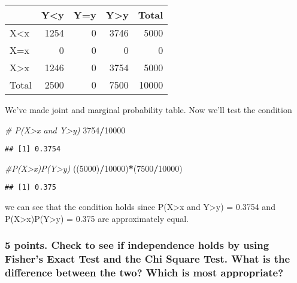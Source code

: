 \documentclass[]{article}
\newenvironment{Shaded}{\begin{snugshade}}{\end{snugshade}}
\newcommand{\CommentTok}[1]{\textcolor[rgb]{0.56,0.35,0.01}{\textit{#1}}}
\newcommand{\DecValTok}[1]{\textcolor[rgb]{0.00,0.00,0.81}{#1}}
\newcommand{\NormalTok}[1]{#1}
\newcommand{\OperatorTok}[1]{\textcolor[rgb]{0.81,0.36,0.00}{\textbf{#1}}}
\begin{document}
\begin{longtable}[]{@{}lrrrr@{}}
\toprule
& Y\textless{}y & Y=y & Y\textgreater{}y & Total\tabularnewline
\midrule
\endhead
X\textless{}x & 1254 & 0 & 3746 & 5000\tabularnewline
X=x & 0 & 0 & 0 & 0\tabularnewline
X\textgreater{}x & 1246 & 0 & 3754 & 5000\tabularnewline
Total & 2500 & 0 & 7500 & 10000\tabularnewline
\bottomrule
\end{longtable}

We've made joint and marginal probability table. Now we'll test the
condition

\begin{Shaded}
\begin{Highlighting}[]
\CommentTok{# P(X>x and Y>y)}
\DecValTok{3754}\OperatorTok{/}\DecValTok{10000}
\end{Highlighting}
\end{Shaded}

\begin{verbatim}
## [1] 0.3754
\end{verbatim}

\begin{Shaded}
\begin{Highlighting}[]
\CommentTok{#P(X>x)P(Y>y)}
\NormalTok{((}\DecValTok{5000}\NormalTok{)}\OperatorTok{/}\DecValTok{10000}\NormalTok{)}\OperatorTok{*}\NormalTok{(}\DecValTok{7500}\OperatorTok{/}\DecValTok{10000}\NormalTok{)}
\end{Highlighting}
\end{Shaded}

\begin{verbatim}
## [1] 0.375
\end{verbatim}

we can see that the condition holds since P(X\textgreater{}x and
Y\textgreater{}y) = 0.3754 and P(X\textgreater{}x)P(Y\textgreater{}y) =
0.375 are approximately equal.

\hypertarget{points.-check-to-see-if-independence-holds-by-using-fishers-exact-test-and-the-chi-square-test.-what-is-the-difference-between-the-two-which-is-most-appropriate}{%
\subsubsection{5 points. Check to see if independence holds by using
Fisher's Exact Test and the Chi Square Test. What is the difference
between the two? Which is most
appropriate?}\label{points.-check-to-see-if-independence-holds-by-using-fishers-exact-test-and-the-chi-square-test.-what-is-the-difference-between-the-two-which-is-most-appropriate}}
\end{document}
